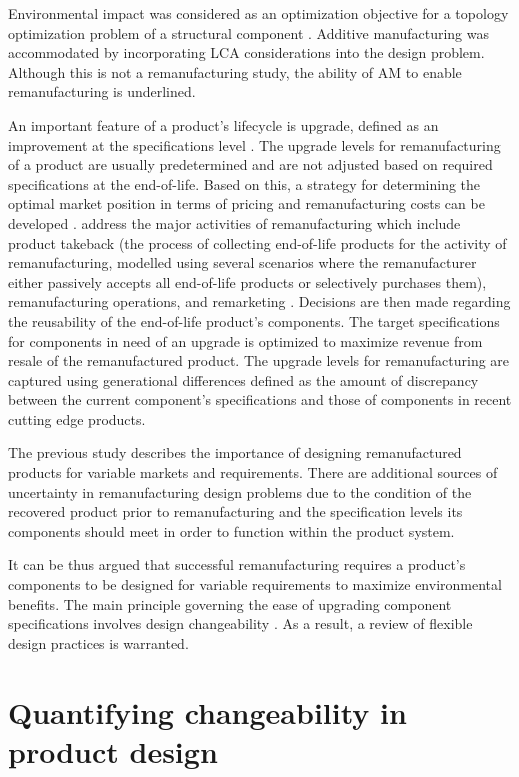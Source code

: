 Environmental impact was considered as an optimization objective for a topology optimization problem of a structural component \cite{Tang2016}. Additive manufacturing was accommodated by incorporating \ac{LCA} considerations into the design problem. Although this is not a remanufacturing study, the ability of \ac{AM} to enable remanufacturing is underlined.

An important feature of a product's lifecycle is upgrade, defined as an improvement at the specifications level \cite{Xing2007}. The upgrade levels for remanufacturing of a product are usually predetermined and are not adjusted based on required specifications at the end-of-life. Based on this, a strategy for determining the optimal market position in terms of pricing and remanufacturing costs can be developed \cite{Kwak2013}. \citeauthor{Kwak2013} address the major activities of remanufacturing which include product takeback (the process of collecting end-of-life products for the activity of remanufacturing, modelled using several scenarios where the remanufacturer either passively accepts all end-of-life products or selectively purchases them), remanufacturing operations, and remarketing \cite{Kwak2013}. Decisions are then made regarding the reusability of the end-of-life product's components. The target specifications for components in need of an upgrade is optimized to maximize revenue from resale of the remanufactured product. The upgrade levels for remanufacturing are captured using generational differences defined as the amount of discrepancy between the current component's specifications and those of components in recent cutting edge products.

The previous study describes the importance of designing remanufactured products for variable markets and requirements. There are additional sources of uncertainty in remanufacturing design problems due to the condition of the recovered product prior to remanufacturing and the specification levels its components should meet in order to function within the product system.

It can be thus argued that successful remanufacturing requires a product's components to be designed for variable requirements to maximize environmental benefits. The main principle governing the ease of upgrading component specifications involves design changeability \cite{Suh2007}. As a result, a review of flexible design practices is warranted.

\section{Quantifying changeability in product design}
\label{sec:changeability}


